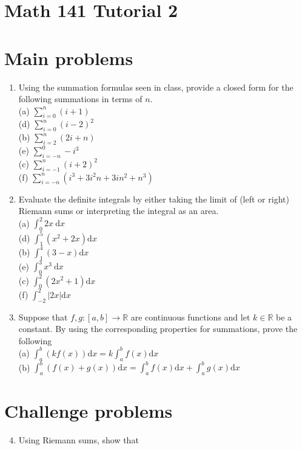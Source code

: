 \documentclass[10pt]{article}
\begin{document}
\section*{Math 141 Tutorial 2}
\section*{Main problems}
\begin{enumerate}
  \item Using the summation formulas seen in class, provide a closed form for the following summations in terms of $n$.\\
(a) $\sum_{i=0}^{n}(i+1)$\\
(d) $\sum_{i=0}^{n}(i-2)^{2}$\\
(b) $\sum_{i=2}^{n}(2 i+n)$\\
(e) $\sum_{i=-n}^{0}-i^{3}$\\
(c) $\sum_{i=-1}^{n}(i+2)^{2}$\\
(f) $\sum_{i=-n}^{n}\left(i^{3}+3 i^{2} n+3 i n^{2}+n^{3}\right)$
  \item Evaluate the definite integrals by either taking the limit of (left or right) Riemann sums or interpreting the integral as an area.\\
(a) $\int_{0}^{2} 2 x \mathrm{~d} x$\\
(d) $\int_{1}^{5}\left(x^{2}+2 x\right) \mathrm{d} x$\\
(b) $\int_{1}^{4}(3-x) \mathrm{d} x$\\
(e) $\int_{0}^{3} x^{3} \mathrm{~d} x$\\
(c) $\int_{0}^{2}\left(2 x^{2}+1\right) \mathrm{d} x$\\
(f) $\int_{-2}^{2}|2 x| \mathrm{d} x$
  \item Suppose that $f, g:[a, b] \rightarrow \mathbb{R}$ are continuous functions and let $k \in \mathbb{R}$ be a constant. By using the corresponding properties for summations, prove the following\\
(a) $\int_{a}^{b}(k f(x)) \mathrm{d} x=k \int_{a}^{b} f(x) \mathrm{d} x$\\
(b) $\int_{a}^{b}(f(x)+g(x)) \mathrm{d} x=\int_{a}^{b} f(x) \mathrm{d} x+\int_{a}^{b} g(x) \mathrm{d} x$
\end{enumerate}

\section*{Challenge problems}
\begin{enumerate}
  \setcounter{enumi}{3}
  \item Using Riemann sums, show that
\end{enumerate}
\end{document}
